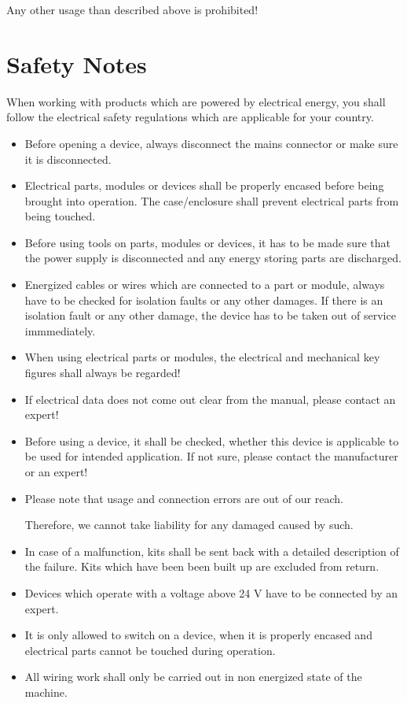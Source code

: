 \documentclass[fleqn,10pt]{SelfArx} %
\begin{document}
Any other usage than described above is prohibited!


\section{Safety Notes}

When working with products which are powered by electrical energy, you shall follow the electrical safety regulations which are  applicable for your country.
\begin{itemize}[noitemsep] %
\item Before opening a device, always disconnect the mains connector or make sure it is disconnected.
\item Electrical parts, modules or devices shall be properly encased before being brought into operation. The case/enclosure shall prevent electrical parts from being touched.
\item Before using tools on parts, modules or devices, it has to be made sure that the power supply is disconnected and any energy storing parts are discharged.
\item Energized cables or wires which are connected to a part or module, always have to be checked for isolation faults or any other damages. If there is an isolation fault or any other damage, the device has to be taken out of service immmediately.
\item When using electrical parts or modules, the electrical and mechanical key figures shall always be regarded!
\item If electrical data does not come out clear from the manual, please contact an expert!
\item Before using a device, it shall be checked, whether this device is applicable to be used for intended application. If not sure, please contact the manufacturer or an expert!
\item Please note that usage and connection errors are out of our reach. \par Therefore, we cannot take liability for any damaged caused by such.
\item In case of a malfunction, kits shall be sent back with a detailed description of the failure. Kits which have been been built up are excluded from return.
\item Devices which operate with a voltage above 24 V have to be connected by an expert.
\item It is only allowed to switch on a device, when it is properly encased and electrical parts cannot be touched during operation.
\item All wiring work shall only be carried out in non energized state of the machine.

\end{itemize}
\end{document}
